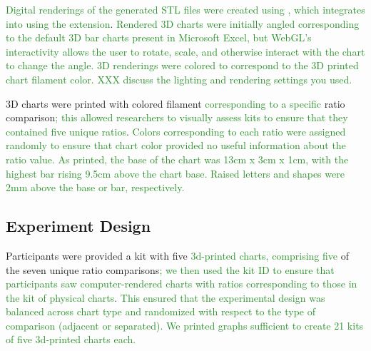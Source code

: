 \documentclass[letterpaper,inpress,dvipsnames]{jdsart}
\begin{document}
{\textcolor{ForestGreen}{Digital renderings of the generated STL files were created using}} \citet{rgl} {\textcolor{ForestGreen}{, which integrates into}} \citet{shiny} {\textcolor{ForestGreen}{using the}} \citet{mozillafoundationWebGL2D3D2023} {\textcolor{ForestGreen}{extension}}.
{\textcolor{ForestGreen}{Rendered 3D charts were initially angled corresponding to the default 3D bar charts present in Microsoft Excel, but WebGL's interactivity allows the user to rotate, scale, and otherwise interact with the chart to change the angle. 3D renderings were colored to correspond to the 3D printed chart filament color.}}
{\textcolor{ForestGreen}{XXX discuss the lighting and rendering settings you used.}}

3D charts were printed with colored filament {\textcolor{ForestGreen}{corresponding to a specific}} ratio comparison{\textcolor{ForestGreen}{; this allowed researchers to visually assess kits to ensure that they contained five unique ratios}}.
{\textcolor{ForestGreen}{Colors corresponding to each ratio were assigned randomly to ensure that chart color provided no useful information about the ratio value.
As printed, the base of the chart was 13cm x 3cm x 1cm, with the highest bar rising 9.5cm above the chart base.
Raised letters and shapes were 2mm above the base or bar, respectively.}}

\hypertarget{experiment-design}{%
\subsection{Experiment Design}\label{experiment-design}}

Participants were provided a kit with five {\textcolor{ForestGreen}{3d-printed charts, comprising five}} of the seven unique ratio comparisons{\textcolor{ForestGreen}{; we then used the kit ID to ensure that participants saw computer-rendered charts with ratios corresponding to those in the kit of physical charts}}.
{\textcolor{ForestGreen}{This ensured that the experimental design was balanced across chart type and randomized with respect to the type of comparison (adjacent or separated).}}
{\textcolor{ForestGreen}{We printed graphs sufficient to create 21 kits of five 3d-printed charts each.}}
\end{document}
